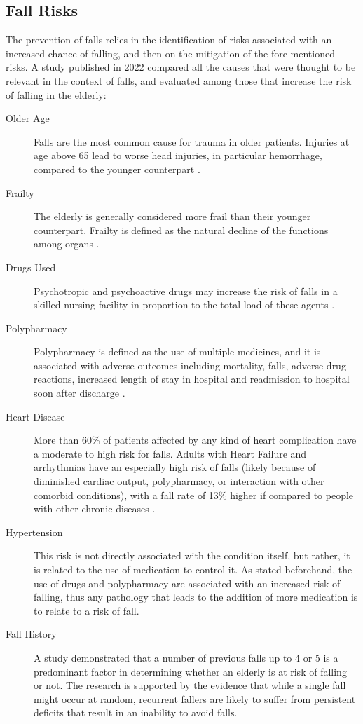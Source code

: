 \subsection{Fall Risks}
The prevention of falls relies in the identification of risks associated with an increased chance of falling, and then on the mitigation of the fore mentioned risks.
A study published in 2022 \cite{RiskFactors} compared all the causes that were thought to be relevant in the context of falls, and evaluated among those that increase the risk of falling in the elderly:
\begin{description}
   \item[Older Age] Falls are the most common cause for trauma in older patients. Injuries at age above 65 lead to worse head injuries, in particular hemorrhage, compared to the younger counterpart \cite{geriatricTrauma}.
   \item[Frailty] The elderly is generally considered more frail than their younger counterpart. Frailty is defined as the natural decline of the functions among organs \cite{geriatricTrauma}.
   \item[Drugs Used] Psychotropic and psychoactive drugs may increase the risk of falls in a skilled nursing facility in proportion to the total load of these agents \cite{drugsEffects}.
   \item[Polypharmacy] Polypharmacy is defined as the use of multiple medicines, and it is associated with adverse outcomes 
   including mortality, falls, adverse drug reactions, increased length of stay in hospital and readmission to hospital soon 
   after discharge \cite{PolypharmacyRisk}.
   \item[Heart Disease] More than 60\% of patients affected by any kind of heart complication have a moderate to high risk for falls. Adults with Heart Failure and arrhythmias have an especially high risk of falls (likely because of diminished cardiac output, polypharmacy, or interaction with other comorbid conditions), with a fall rate of 13\% higher if compared to people with other chronic diseases \cite{HeartRisk}.
   \item[Hypertension] This risk is not directly associated with the condition itself, but rather, it is related to the use of medication to control it. As stated beforehand, the use of drugs and polypharmacy are associated with an increased risk of falling, thus any pathology that leads to the addition of more medication is to relate to a risk of fall. 
   \item[Fall History] A study \cite{HistoryRisk} demonstrated that a number of previous falls up to 4 or 5 is a predominant factor in determining whether an elderly is at risk of falling or not. The research is supported by the evidence that while a single fall might occur at random, recurrent fallers are likely to suffer from persistent deficits that result in an inability to avoid falls.

\end{description}
